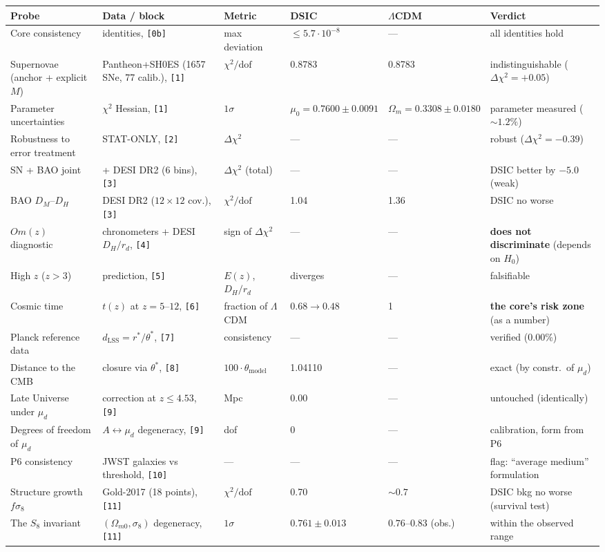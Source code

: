 \documentclass[a4paper,10pt]{article}
\begin{document}
\begin{table}[htbp]
\centering
\footnotesize
\setlength{\tabcolsep}{4pt}
\begin{tabular}{@{}p{2.5cm}p{3.0cm}p{1.7cm}p{2.4cm}p{2.4cm}p{2.9cm}@{}}
\toprule
\textbf{Probe} & \textbf{Data / block} & \textbf{Metric} & \textbf{DSIC} & \textbf{$\Lambda$CDM} & \textbf{Verdict} \\
\midrule
Core consistency & identities, \texttt{[0b]} & max deviation & $\le 5.7{\cdot}10^{-8}$ & --- & all identities hold \\
Supernovae (anchor + explicit $M$) & Pantheon+SH0ES (1657 SNe, 77 calib.), \texttt{[1]} & $\chi^2/\text{dof}$ & 0.8783 & 0.8783 & indistinguishable ($\Delta\chi^2 = +0.05$) \\
Parameter uncertainties & $\chi^2$ Hessian, \texttt{[1]} & $1\sigma$ & $\mu_0 = 0.7600 \pm 0.0091$ & $\Omega_m = 0.3308 \pm 0.0180$ & parameter measured (${\sim}1.2\%$) \\
Robustness to error treatment & STAT-ONLY, \texttt{[2]} & $\Delta\chi^2$ & --- & --- & robust ($\Delta\chi^2 = -0.39$) \\
SN + BAO joint & + DESI DR2 (6 bins), \texttt{[3]} & $\Delta\chi^2$ (total) & --- & --- & DSIC better by $-5.0$ (weak) \\
BAO $D_M$--$D_H$ & DESI DR2 ($12{\times}12$ cov.), \texttt{[3]} & $\chi^2/\text{dof}$ & 1.04 & 1.36 & DSIC no worse \\
$Om(z)$ diagnostic & chronometers + DESI $D_H/r_d$, \texttt{[4]} & sign of $\Delta\chi^2$ & --- & --- & \textbf{does not discriminate} (depends on $H_0$) \\
High $z$ ($z > 3$) & prediction, \texttt{[5]} & $E(z)$, $D_H/r_d$ & diverges & --- & falsifiable \\
Cosmic time & $t(z)$ at $z = 5\text{--}12$, \texttt{[6]} & fraction of $\Lambda$CDM & $0.68 \to 0.48$ & 1 & \textbf{the core's risk zone} (as a number) \\
Planck reference data & $d_{\text{LSS}} = r^*/\theta^*$, \texttt{[7]} & consistency & --- & --- & verified (0.00\%) \\
Distance to the CMB & closure via $\theta^*$, \texttt{[8]} & $100{\cdot}\theta_{\text{model}}$ & 1.04110 & --- & exact (by constr.\ of $\mu_d$) \\
Late Universe under $\mu_d$ & correction at $z \le 4.53$, \texttt{[9]} & Mpc & 0.00 & --- & untouched (identically) \\
Degrees of freedom of $\mu_d$ & $A \leftrightarrow \mu_d$ degeneracy, \texttt{[9]} & dof & 0 & --- & calibration, form from P6 \\
P6 consistency & JWST galaxies vs threshold, \texttt{[10]} & --- & --- & --- & flag: ``average medium'' formulation \\
Structure growth $f\sigma_8$ & Gold-2017 (18 points), \texttt{[11]} & $\chi^2/\text{dof}$ & 0.70 & ${\sim}0.7$ & DSIC bkg no worse (survival test) \\
The $S_8$ invariant & $(\Omega_{m0}, \sigma_8)$ degeneracy, \texttt{[11]} & $1\sigma$ & $0.761 \pm 0.013$ & $0.76\text{--}0.83$ (obs.) & within the observed range \\
\bottomrule
\end{tabular}
\end{table}
\end{document}
